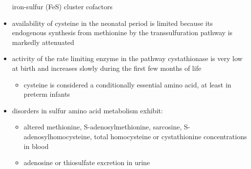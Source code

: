 \documentclass{scrartcl}
\begin{document}
\begin{itemize}
iron-sulfur (FeS) cluster cofactors
\item availability of cysteine in the neonatal period is limited because
its endogenous synthesis from methionine by the transsulfuration
pathway is markedly attenuated
\item activity of the rate limiting enzyme in the pathway cystathionase is
very low at birth and increases slowly during the first few months
of life
\begin{itemize}
\item cysteine is considered a conditionally essential amino acid, at
least in preterm infants
\end{itemize}

\item disorders in sulfur amino acid metabolism exhibit:
\begin{itemize}
\item altered methionine, S-adenosylmethionine, sarcosine, S-adenosylhomocysteine,
total homocysteine or cystathionine concentrations in blood
\item adenosine or thiosulfate excretion in urine
\end{itemize}
\end{itemize}
\end{document}
